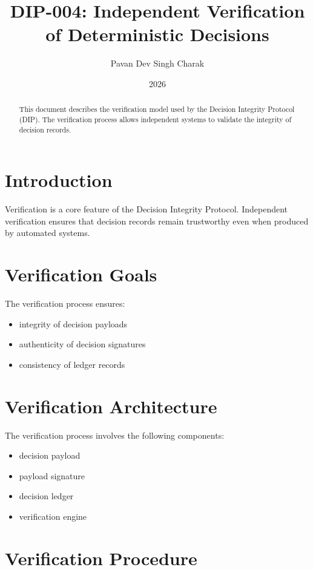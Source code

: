 \documentclass[11pt]{article}
\title{DIP-004: Independent Verification of Deterministic Decisions}
\author{Pavan Dev Singh Charak}
\date{2026}
\begin{document}
\maketitle

\begin{abstract}

This document describes the verification model used by the
Decision Integrity Protocol (DIP). The verification process
allows independent systems to validate the integrity of
decision records.

\end{abstract}

\section{Introduction}

Verification is a core feature of the Decision Integrity
Protocol. Independent verification ensures that decision
records remain trustworthy even when produced by automated
systems.

\section{Verification Goals}

The verification process ensures:

\begin{itemize}
\item integrity of decision payloads
\item authenticity of decision signatures
\item consistency of ledger records
\end{itemize}

\section{Verification Architecture}

The verification process involves the following components:

\begin{itemize}
\item decision payload
\item payload signature
\item decision ledger
\item verification engine
\end{itemize}

\section{Verification Procedure}
\end{document}
